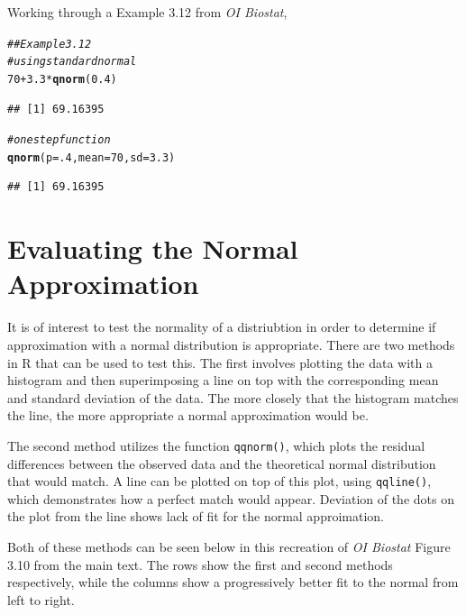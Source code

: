 \documentclass{report}\usepackage[]{graphicx}\usepackage[]{color}
\makeatletter
\newcommand{\hlnum}[1]{\textcolor[rgb]{0.686,0.059,0.569}{#1}}%
\newcommand{\hlcom}[1]{\textcolor[rgb]{0.678,0.584,0.686}{\textit{#1}}}%
\newcommand{\hlopt}[1]{\textcolor[rgb]{0,0,0}{#1}}%
\newcommand{\hlstd}[1]{\textcolor[rgb]{0.345,0.345,0.345}{#1}}%
\newcommand{\hlkwc}[1]{\textcolor[rgb]{0.333,0.667,0.333}{#1}}%
\newcommand{\hlkwd}[1]{\textcolor[rgb]{0.737,0.353,0.396}{\textbf{#1}}}%
\newenvironment{kframe}{%
 \def\at@end@of@kframe{}%
 \ifinner\ifhmode%
  \def\at@end@of@kframe{\end{minipage}}%
  \begin{minipage}{\columnwidth}%
 \fi\fi%
 \def\FrameCommand##1{\hskip\@totalleftmargin \hskip-\fboxsep
 \colorbox{shadecolor}{##1}\hskip-\fboxsep
     \hskip-\linewidth \hskip-\@totalleftmargin \hskip\columnwidth}%
 \MakeFramed {\advance\hsize-\width
   \@totalleftmargin\z@ \linewidth\hsize
   \@setminipage}}%
 {\par\unskip\endMakeFramed%
 \at@end@of@kframe}
\newenvironment{knitrout}{}{} %
\makeatother
\begin{document}
\vspace{.5cm}
Working through a Example 3.12 from \textit{OI Biostat}, 
\begin{knitrout}
\color{fgcolor}\begin{kframe}
\begin{alltt}
\hlcom{## Example 3.12 }
\hlcom{# using standard normal }
\hlnum{70} \hlopt{+} \hlnum{3.3}\hlopt{*}\hlkwd{qnorm}\hlstd{(}\hlnum{0.4}\hlstd{)}
\end{alltt}
\begin{verbatim}
## [1] 69.16395
\end{verbatim}
\begin{alltt}
\hlcom{# one step function }
\hlkwd{qnorm}\hlstd{(}\hlkwc{p} \hlstd{=} \hlnum{.4}\hlstd{,} \hlkwc{mean} \hlstd{=} \hlnum{70}\hlstd{,} \hlkwc{sd} \hlstd{=} \hlnum{3.3}\hlstd{)}
\end{alltt}
\begin{verbatim}
## [1] 69.16395
\end{verbatim}
\end{kframe}
\end{knitrout}

\section{Evaluating the Normal Approximation} 
It is of interest to test the normality of a distriubtion in order to determine if approximation with a normal distribution is appropriate. There are two methods in \textsf{R} that can be used to test this.  The first involves plotting the data with a histogram and then superimposing a line on top with the corresponding mean and standard deviation of the data.  The more closely that the histogram matches the line, the more appropriate a normal approximation would be.  

The second method utilizes the function \texttt{qqnorm()}, which plots the residual differences between the observed data and the theoretical normal distribution that would match.  A line can be plotted on top of this plot, using \texttt{qqline()}, which demonstrates how a perfect match would appear.  Deviation of the dots on the plot from the line shows lack of fit for the normal approimation.  

Both of these methods can be seen below in this recreation of \textit{OI Biostat} Figure 3.10 from the main text.  The rows show the first and second methods respectively, while the columns show a progressively better fit to the normal from left to right.  
\end{document}
